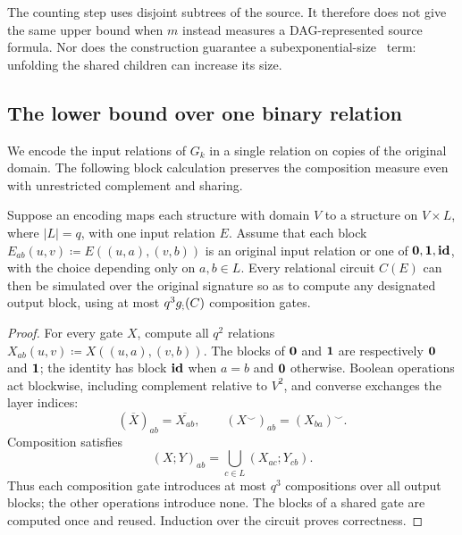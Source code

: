 The counting step uses disjoint subtrees of the source. It therefore
does not give the same upper bound when $m$ instead measures a
DAG-represented source formula. Nor does the construction guarantee a
subexponential-size \CoR\ term: unfolding the shared children can
increase its size.

\subsection{The lower bound over one binary relation}\label{sec:single-relation}
We encode the input relations of $G_k$ in a single relation on copies
of the original domain. The following block calculation preserves
the composition measure even with unrestricted complement and sharing.

\begin{lemma}\label{lem:block-simulation}
Suppose an encoding maps each structure with domain $V$ to a structure
on $V\times L$, where $|L|=q$, with one input relation $E$.
Assume that each block
$E_{ab}(u,v)\coloneqq E((u,a),(v,b))$ is an original input relation or one of
$\mathbf{0},\mathbf{1},\mathbf{id}$, with the choice depending only on $a,b\in L$.
Every relational circuit $C(E)$ can then be simulated over the
original signature so as to compute any designated output block,
using at most $q^3g_{;}(C)$ composition gates.
\end{lemma}
\begin{proof}
For every gate $X$, compute all $q^2$ relations
$X_{ab}(u,v)\coloneqq X((u,a),(v,b))$.
The blocks of $\mathbf{0}$ and $\mathbf{1}$ are respectively $\mathbf{0}$ and $\mathbf{1}$;
the identity has block $\mathbf{id}$ when $a=b$ and $\mathbf{0}$ otherwise.
Boolean operations act blockwise, including complement relative to
$V^2$, and converse exchanges the layer indices:
\[
 (\overline X)_{ab}=\overline{X_{ab}},
 \qquad
 (X^\smile)_{ab}=(X_{ba})^\smile.
\]
Composition satisfies
\[
 (X;Y)_{ab}=\bigcup_{c\in L}(X_{ac};Y_{cb}).
\]
Thus each composition gate introduces at most $q^3$ compositions
over all output blocks; the other operations introduce none.
The blocks of a shared gate are computed once and reused.
Induction over the circuit proves correctness.
\end{proof}


